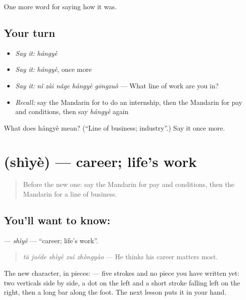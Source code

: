 \begin{grammarlens}[title={What you've built}]
One more word for saying how it was.
\end{grammarlens}

\subsection*{Your turn}
\begin{itemize}
\raggedright
  \item \emph{Say it:} \emph{hángyè}
  \item \emph{Say it:} \emph{hángyè}, once more
  \item \emph{Say it:} \emph{nǐ zài nǎge hángyè gōngzuò} — What line of work are you in?
  \item \emph{Recall:} say the Mandarin for to do an internship, then the Mandarin for pay and conditions, then say \emph{hángyè} again
\end{itemize}

\begin{tcolorbox}[breakable,colback=teal!4,colframe=teal!35!black,title={Before you move on}]
What does hángyè mean? (\textquotedblleft{}Line of business; industry\textquotedblright{}.) Say it once more.
\end{tcolorbox}
\section[\texorpdfstring{\zh{事业} (shìyè)}{事业 (shìyè)}]{ (shìyè) — career; life's work}

\label{lesson:ZH-C487-shiye}



\begin{quote}
Before the new one: say the Mandarin for pay and conditions, then the Mandarin for a line of business.
\end{quote}

\subsection*{You'll want to know: }
\textbf{} — \emph{shìyè} — \textquotedblleft{}career; life's work\textquotedblright{}.

\begin{quote}
\textbf{} \emph{tā juéde shìyè zuì zhòngyào} — He thinks his career matters most.
\end{quote}

The new character, in pieces:  — five strokes and no piece you have written yet: two verticals side by side, a dot on the left and a short stroke falling left on the right, then a long bar along the foot. The next lesson puts it in your hand.

